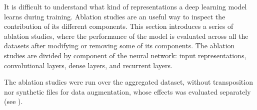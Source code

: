 
It is difficult to understand what kind of representations a
deep learning model learns during training. Ablation studies
are an useful way to inspect the contribution of its
different components. This section introduces a series of
ablation studies, where the performance of the model is
evaluated across all the datasets after modifying or
removing some of its components. The ablation studies are
divided by component of the neural network: input
representations, convolutional layers, dense layers, and
recurrent layers.

The ablation studies were run over the aggregated dataset,
without transposition nor synthetic files for data
augmentation, whose effects was evaluated separately (see ).
